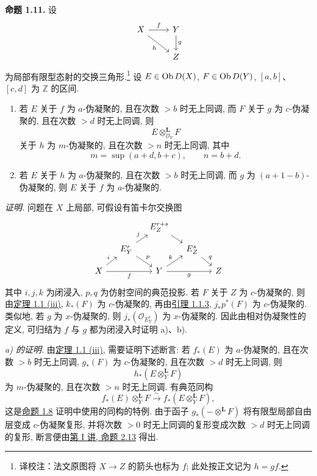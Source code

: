 \textbf{命题 1.11.} 设
\[
\begin{tikzcd}
X \arrow[r,"f"] \arrow[dr,"h"'] & Y \arrow[d,"g"]\\
& Z
\end{tikzcd}
\]
为局部有限型态射的交换三角形.\footnote{译校注：法文原图将 $X\to Z$ 的箭头也标为 $f$; 此处按正文记为 $h=gf$.} 设 \(E\in\operatorname{Ob} D(X)\), \(F\in\operatorname{Ob} D(Y)\), \([a,b]\)、\([c,d]\) 为 \(\mathbb Z\) 的区间.

\begin{enumerate}[label=\alph*)]
\item 若 \(E\) 关于 \(f\) 为 \(a\)-伪凝聚的, 且在次数 \(>b\) 时无上同调, 而 \(F\) 关于 \(g\) 为 \(c\)-伪凝聚的, 且在次数 \(>d\) 时无上同调, 则
\[
  E\otimes_{\mathcal O_Y}^{\mathbf L}F
\]
关于 \(h\) 为 \(m\)-伪凝聚的, 且在次数 \(>n\) 时无上同调, 其中
\[
  m=\sup(a+d,b+c),\qquad n=b+d.
\]

\item 若 \(E\) 关于 \(h\) 为 \(a\)-伪凝聚的, 且在次数 \(>b\) 时无上同调, 而 \(g\) 为 \((a+1-b)\)-伪凝聚的, 则 \(E\) 关于 \(f\) 为 \(a\)-伪凝聚的.
\end{enumerate}

\emph{证明.} 问题在 \(X\) 上局部, 可假设有笛卡尔\mbox{交换图}
\[
\begin{tikzcd}[column sep=small,row sep=small]
&& E^{r+s}_Z\arrow[dr] &&\\
& E^r_Y\arrow[ur,"j"]\arrow[dr,"p"] && E^s_Z\arrow[dr,"q"] &\\
X\arrow[ur,"i"]\arrow[rr,"f"'] && Y\arrow[ur,"k"]\arrow[rr,"g"'] && Z
\end{tikzcd}
\]
其中 \(i,j,k\) 为闭浸入, \(p,q\) 为仿射空间的典范投影. 若 \(F\) 关于 \(Z\) 为 \(c\)-伪凝聚的, 则由\hyperlink{sga6.e03.thm.1-1}{定理 1.1 (iii)}, \(k_*(F)\) 为 \(c\)-伪凝聚的, 再由\hyperlink{sga6.e03.lem.1-1-3}{引理 1.1.3}, \(j_*p^*(F)\) 为 \(c\)-伪凝聚的. 类似地, 若 \(g\) 为 \(x\)-伪凝聚的, 则 \(j_*(\mathcal O_{E^r_Y})\) 为 \(x\)-伪凝聚的. 因此由相对伪凝聚性的定义, 可归结为 \(f\) 与 \(g\) 都为闭浸入时证明 a)、b).

\emph{a) 的证明.} 由\hyperlink{sga6.e03.thm.1-1}{定理 1.1 (iii)}, 需要证明下述断言: 若 \(f_*(E)\) 为 \(a\)-伪凝聚的, 且在次数 \(>b\) 时无上同调, \(g_*(F)\) 为 \(c\)-伪凝聚的, 且在次数 \(>d\) 时无上同调, 则
\[
  h_*(E\otimes_Y^{\mathbf L}F)
\]
为 \(m\)-伪凝聚的, 且在次数 \(>n\) 时无上同调. 有典范同构
\[
  f_*(E)\otimes_Y^{\mathbf L}F\xrightarrow{\sim} f_*(E\otimes_Y^{\mathbf L}F),
\]
这是\hyperlink{sga6.e03.prop.1-8}{命题 1.8} 证明中使用的同构的特例. 由于函子 \(g_*(-\otimes^{\mathbf L}F)\) 将有限型局部自由层变成 \(c\)-伪凝聚复形, 并将次数 \(>0\) 时无上同调的复形变成次数 \(>d\) 时无上同调的复形, 断言便由\hyperlink{sga6.e01.prop.2-13}{第 I 讲, 命题 2.13} 得出.

